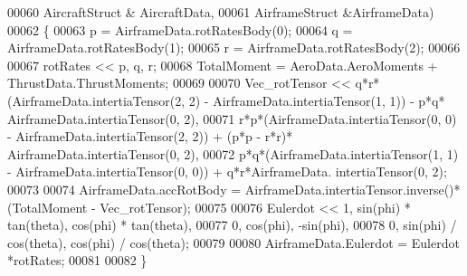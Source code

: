 \begin{DoxyCode}
00060                                 AircraftStruct & AircraftData,
00061                                 AirframeStruct &AirframeData)
00062 \{
00063     p = AirframeData.rotRatesBody(0);
00064     q = AirframeData.rotRatesBody(1);
00065     r = AirframeData.rotRatesBody(2);
00066 
00067     rotRates << p, q, r;
00068     TotalMoment = AeroData.AeroMoments + ThrustData.ThrustMoments;
00069 
00070     Vec\_rotTensor << q*r*(AirframeData.intertiaTensor(2, 2) - AirframeData.intertiaTensor(1, 1)) - p*q*
      AirframeData.intertiaTensor(0, 2),
00071         r*p*(AirframeData.intertiaTensor(0, 0) - AirframeData.intertiaTensor(2, 2)) + (p*p - r*r)*
      AirframeData.intertiaTensor(0, 2),
00072         p*q*(AirframeData.intertiaTensor(1, 1) - AirframeData.intertiaTensor(0, 0)) + q*r*AirframeData.
      intertiaTensor(0, 2);
00073 
00074     AirframeData.accRotBody = AirframeData.intertiaTensor.inverse()*(TotalMoment - Vec\_rotTensor);
00075 
00076     Eulerdot << 1, sin(phi) * tan(theta), cos(phi) * tan(theta),
00077                 0, cos(phi), -sin(phi),
00078                 0, sin(phi) / cos(theta), cos(phi) / cos(theta);
00079 
00080     AirframeData.Eulerdot = Eulerdot *rotRates;
00081 
00082 \}
\end{DoxyCode}
